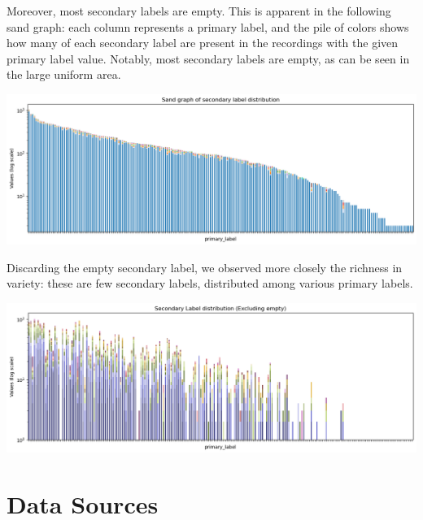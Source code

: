 \documentclass[11pt]{article}
\begin{document}
\vspace{1em}

\begin{minipage}{0.48\linewidth}
  Moreover, most secondary labels are empty. This is apparent in the following sand graph: each column represents a primary label, and the pile of colors shows how many of each secondary label are present in the recordings with the given primary label value. Notably, most secondary labels are empty, as can be seen in the large uniform area.
\end{minipage}
\hfill
\begin{minipage}{0.48\linewidth}
  \includegraphics[width=\linewidth]{img/train_secondary_sand.png}
\end{minipage}

\vspace{1em}

\begin{minipage}{0.48\linewidth}
  Discarding the empty secondary label, we observed more closely the richness in variety: these are few secondary labels, distributed among various primary labels.
\end{minipage}
\hfill
\begin{minipage}{0.48\linewidth}
  \includegraphics[width=\linewidth]{img/train_secondary_sand_nonempty.png}
\end{minipage}

\section*{Data Sources}
\end{document}
